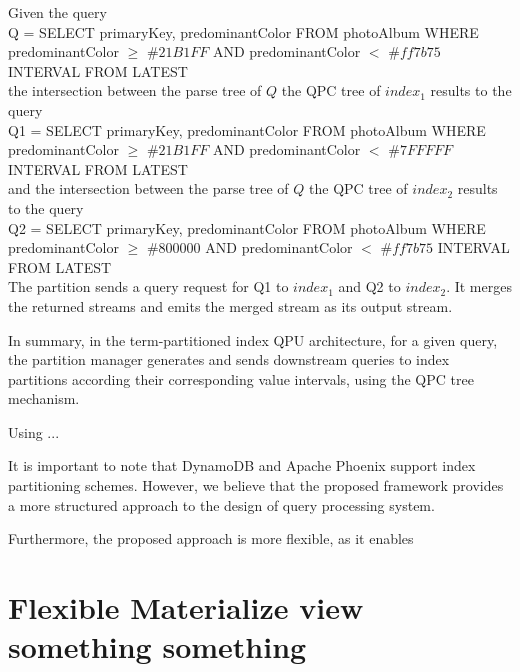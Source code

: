 Given the query \\
{\obeylines\obeyspaces
Q = SELECT primaryKey, predominantColor
    FROM photoAlbum
    WHERE predominantColor $\geq$ $\#21B1FF$ AND predominantColor $<$ $\#ff7b75$
    INTERVAL FROM LATEST
} ~\\
the intersection between the parse tree of $Q$ the QPC tree of $index_1$ results to the query \\
{\obeylines\obeyspaces
Q1 = SELECT primaryKey, predominantColor
    FROM photoAlbum
    WHERE predominantColor $\geq$ $\#21B1FF$ AND predominantColor $<$ $\#7FFFFF$
    INTERVAL FROM LATEST
} ~\\
and the intersection between the parse tree of $Q$ the QPC tree of $index_2$ results to the query \\
{\obeylines\obeyspaces
Q2 = SELECT primaryKey, predominantColor
    FROM photoAlbum
    WHERE predominantColor $\geq$ $\#800000$ AND predominantColor $<$ $\#ff7b75$
    INTERVAL FROM LATEST
} ~\\
The partition sends a query request for Q1 to $index_1$ and Q2 to $index_2$.
It merges the returned streams and emits the merged stream as its output stream.

In summary, in the term-partitioned index QPU architecture,
for a given query, the partition manager generates and sends downstream queries to index partitions according their corresponding
value intervals, using the QPC tree mechanism.

\medskip
\noindent

Using ... 

It is important to note that DynamoDB \cite{dynamodb:secondaryindexes} and Apache Phoenix \cite{phoenix:secondaryidnexing}
support index partitioning schemes.
However, we believe that the proposed framework provides a more structured approach to the design of query processing system.

Furthermore, the proposed approach is more flexible, as it enables



\section{Flexible Materialize view something something}

